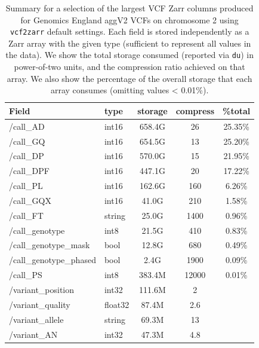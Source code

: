 \documentclass[a4paper,num-refs]{oup-contemporary}
\begin{document}
\begin{table}
\caption{Summary for a selection of the largest VCF Zarr columns produced for 
Genomics England aggV2 VCFs on chromosome 2 using \texttt{vcf2zarr}
default settings. Each field is stored independently 
as a Zarr array with the given type (sufficient to represent all values in the
data). We show the total storage consumed (reported via \texttt{du}) in 
power-of-two units, and the compression ratio achieved on that array.
We also show the percentage of the overall storage that each array consumes
(omitting values < 0.01\%).
\label{tab-genomics-england-data}}
\begin{tabular}{llS[table-format=3.1]S[table-format=3.2]S[table-format=3.2]}
\toprule
{Field} & {type} & {storage} & {compress} & {\%total} \\
\midrule
/call\_AD & int16 & 658.4G & 26 & 25.35\% \\
/call\_GQ & int16 & 654.5G & 13 & 25.20\% \\
/call\_DP & int16 & 570.0G & 15 & 21.95\% \\
/call\_DPF & int16 & 447.1G & 20 & 17.22\% \\
/call\_PL & int16 & 162.6G & 160 & 6.26\% \\
/call\_GQX & int16 & 41.0G & 210 & 1.58\% \\
/call\_FT & string & 25.0G & 1400& 0.96\% \\
/call\_genotype & int8 & 21.5G & 410& 0.83\% \\
/call\_genotype\_mask & bool & 12.8G & 680& 0.49\% \\
/call\_genotype\_phased & bool & 2.4G & 1900& 0.09\% \\
/call\_PS & int8 & 383.4M & 12000& 0.01\% \\
/variant\_position & int32 & 111.6M & 2 & \\
/variant\_quality & float32 & 87.4M & 2.6 & \\
/variant\_allele & string & 69.3M & 13 & \\
/variant\_AN & int32 & 47.3M & 4.8 & \\

\end{tabular}
\end{table}
\end{document}

